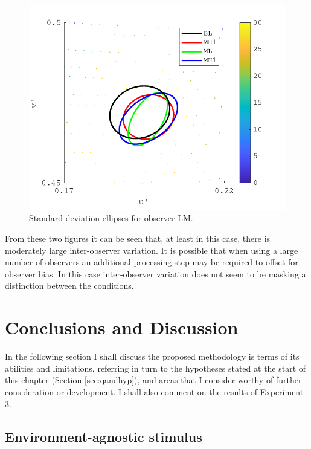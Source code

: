 \begin{figure}[hbtp]
\includegraphics[max width=\textwidth]{figs/tablet/PAMELA_20180205_Individual2.pdf} 
\caption{Standard deviation ellipses for observer LM.}
\label{fig:PAMELA_20180205_Individual2}
\end{figure}

From these two figures it can be seen that, at least in this case, there is moderately large inter-observer variation. It is possible that when using a large number of observers an additional processing step may be required to offset for observer bias. In this case inter-observer variation does not seem to be masking a distinction between the conditions.

\clearpage

\section{Conclusions and Discussion}

In the following section I shall discuss the proposed methodology is terms of its abilities and limitations, referring in turn to the hypotheses stated at the start of this chapter (Section \ref{sec:qandhyp}), and areas that I consider worthy of further consideration or development. I shall also comment on the results of Experiment 3.

\subsection{Environment-agnostic stimulus}


